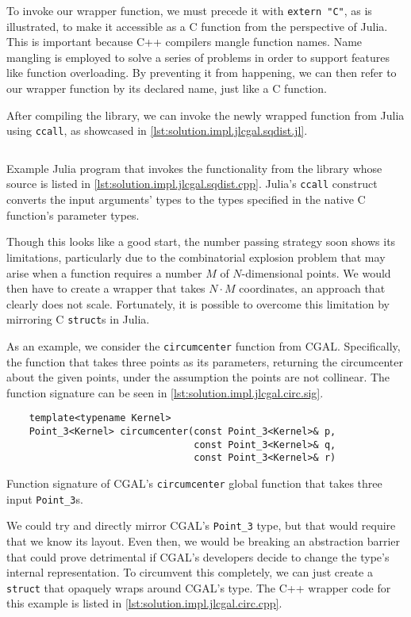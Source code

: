 To invoke our wrapper function, we must precede it with \texttt{extern
"C"}, as is illustrated, to make it accessible as a C function from the
perspective of Julia.  This is important because C++ compilers mangle function
names.  Name mangling is employed to solve a series of problems in order to
support features like function overloading. By preventing it from happening, we
can then refer to our wrapper function by its declared name, just like a C
function.

After compiling the library, we can invoke the newly wrapped function from Julia
using \texttt{ccall}, as showcased in
\cref{lst:solution.impl.jlcgal.sqdist.jl}.

\begin{listing}[htb]
  \inputminted{julia}{jl/sqdist.jl}
  \caption[Julia squared distance example program]{
    Example Julia program that invokes the functionality from the library whose
    source is listed in \cref{lst:solution.impl.jlcgal.sqdist.cpp}.  Julia's
    \texttt{ccall} construct converts the input arguments' types to
    the types specified in the native C function's parameter types.}%
  \label{lst:solution.impl.jlcgal.sqdist.jl}
\end{listing}

Though this looks like a good start, the number passing strategy soon shows its
limitations, particularly due to the combinatorial explosion problem that may
arise when a function requires a number $M$ of $N$-dimensional points.  We would
then have to create a wrapper that takes $N\cdot M$ coordinates,  an approach
that clearly does not scale.  Fortunately, it is possible to overcome this
limitation by mirroring C \texttt{struct}s in Julia.

As an example, we consider the \texttt{circumcenter} function from \ac{CGAL}.
Specifically, the function that takes three points as its parameters, returning
the circumcenter about the given points, under the assumption the points are not
collinear.  The function signature can be seen in
\cref{lst:solution.impl.jlcgal.circ.sig}.  
\begin{listing}
  \begin{verbatim}
    template<typename Kernel> 
    Point_3<Kernel> circumcenter(const Point_3<Kernel>& p,
                                 const Point_3<Kernel>& q,
                                 const Point_3<Kernel>& r)
  \end{verbatim}
  \caption[\texttt{circumcenter} function signature]{
    Function signature of \ac{CGAL}'s \texttt{circumcenter} global function that
    takes three input \texttt{Point\_3}s.}%
  \label{lst:solution.impl.jlcgal.circ.sig}
\end{listing}
We could try and directly mirror
\ac{CGAL}'s \texttt{Point\_3} type, but that would require that we know its
layout.  Even then, we would be breaking an abstraction barrier that could prove
detrimental if \ac{CGAL}'s developers decide to change the type's internal
representation.  To circumvent this completely, we can just create a
\texttt{struct} that opaquely wraps around \ac{CGAL}'s type.  The C++
wrapper code for this example is listed in
\cref{lst:solution.impl.jlcgal.circ.cpp}.

